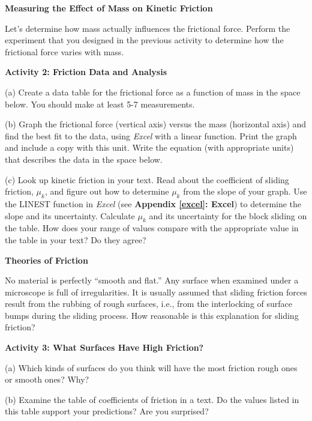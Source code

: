 \textbf{Measuring the Effect of Mass on Kinetic Friction }

Let's determine how mass actually influences the frictional force. Perform the
experiment that you designed in the previous activity to determine how the frictional
force varies with mass. 

\newpage

\textbf{Activity 2: Friction Data and Analysis }

(a) Create a data table for the frictional force as a function of mass in the
space below. You should make at least 5-7 measurements. 
\vspace{45mm}

(b) Graph the frictional force (vertical axis) versus the mass (horizontal 
axis) and find the best fit to the data, using \textit{Excel} with a linear function. 
Print the graph and include a copy with this unit. Write the equation (with 
appropriate units) that describes the data in the space below. 
\vspace{15mm}

(c) Look up kinetic friction in your text. Read about the coefficient
of sliding friction, \( \mu _{k} \), and figure out how to determine 
\( \mu _{k} \) from the slope of your graph. Use the LINEST function in \textit{Excel} (see \textbf{Appendix \ref{excel}: Excel}) to determine the slope and its uncertainty.  Calculate \( \mu _{k} \) and its uncertainty for the block sliding on
the table. How does your range of values compare with the appropriate value in 
the table in your text? Do they agree?
\vspace{30mm}

\textbf{Theories of Friction} 

No material is perfectly ``smooth and flat.'' Any surface when
examined under a microscope is full of irregularities. It is usually assumed
that sliding friction forces result from the rubbing of rough surfaces, i.e.,
from the interlocking of surface bumps during the sliding process. How reasonable
is this explanation for sliding friction?

\textbf{Activity 3: What Surfaces Have High Friction?} 

(a) Which kinds of surfaces do you think will have the most friction rough ones
or smooth ones? Why?
\vspace{20mm}

(b) Examine the table of coefficients of friction in a text. Do the values listed
in this table support your predictions? Are you surprised? 
\vspace{20mm}

